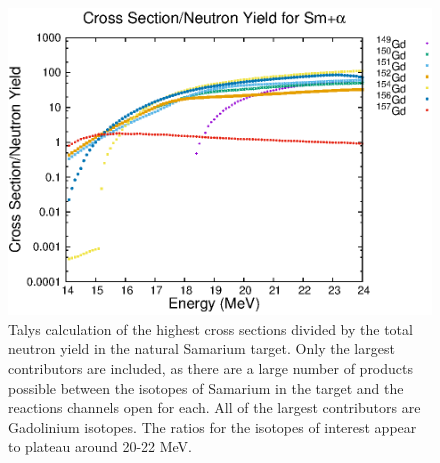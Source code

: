 \begin{figure}[t]
    \centering
    \includegraphics[scale=1]{Setup_Figs/Talys_Ratio.eps}
    \caption{Talys calculation of the highest cross sections divided by the total neutron yield in the natural Samarium target. Only the largest contributors are included, as there are a large number of products possible between the isotopes of Samarium in the target and the reactions channels open for each. All of the largest contributors are Gadolinium isotopes. The ratios for the isotopes of interest appear to plateau around 20-22 MeV.}
    \label{fig:talys}
\end{figure}